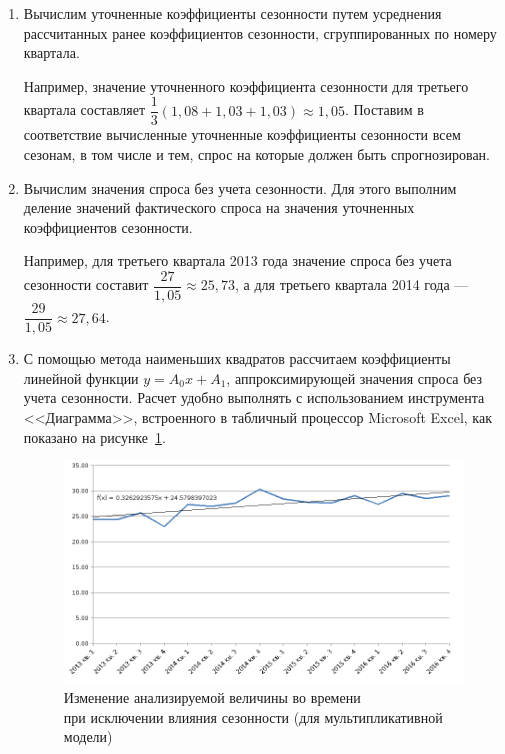 \begin{enumerate}
\item Вычислим уточненные коэффициенты сезонности путем усреднения
  рассчитанных ранее коэффициентов сезонности,
  сгруппированных по номеру квартала.

  Например,
  значение уточненного коэффициента сезонности для третьего квартала
  составляет
  \( \dfrac{1}{3} (1{,}08 + 1{,}03 + 1{,}03) \approx 1{,}05 \).
  Поставим в соответствие
  вычисленные уточненные коэффициенты сезонности всем сезонам,
  в том числе и тем, спрос на которые должен быть спрогнозирован.

\item Вычислим значения спроса без учета сезонности.
  Для этого выполним деление значений фактического спроса на
  значения уточненных коэффициентов сезонности.

  Например, для третьего квартала 2013 года значение спроса
  без учета сезонности составит \( \dfrac{27}{1{,}05} \approx 25{,}73 \),
  а для третьего квартала 2014 года ---
  \( \dfrac{29}{1{,}05} \approx 27{,}64 \).

\item С помощью метода наименьших квадратов рассчитаем коэффициенты
  линейной функции \( y = A_0 x + A_1 \), аппроксимирующей значения спроса
  без учета сезонности. Расчет удобно выполнять с использованием инструмента
  <<Диаграмма>>, встроенного в табличный процессор Microsoft Excel,
  как показано на рисунке~\ref{fig:mult_without_season}.

  \begin{figure}[h!]
    \centering
    \includegraphics[width=150mm]{pic/mult_without_season}
    \caption{Изменение анализируемой величины во времени \\
      при исключении влияния сезонности (для мультипликативной модели)}
    \label{fig:mult_without_season}
  \end{figure}


\end{enumerate}
